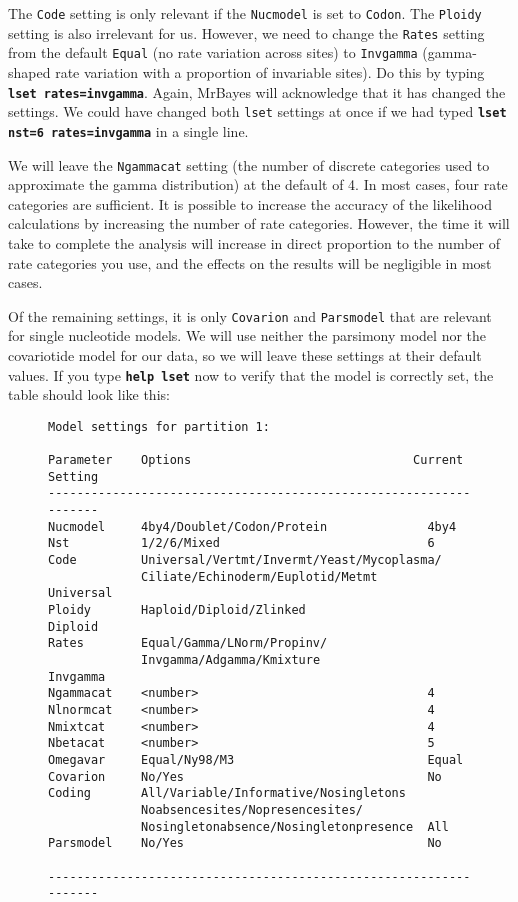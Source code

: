 \documentclass[12pt]{book}
\newcommand{\ttt}[1]{\texttt{#1}}
\newcommand{\tb}[1]{\ttt{\textbf{#1}}}
\begin{document}
The \texttt{Code} setting is only relevant if the \texttt{Nucmodel} is set to \texttt{Codon}. The
\texttt{Ploidy} setting is also irrelevant for us. However, we need to change the \texttt{Rates}
setting from the default \texttt{Equal} (no rate variation across sites) to \texttt{Invgamma}
(gamma-shaped rate variation with a proportion of invariable sites). Do this by typing \tb{lset
rates=invgamma}.  Again, MrBayes will acknowledge that it has changed the settings. We could have
changed both \texttt{lset} settings at once if we had typed \tb{lset nst=6 rates=invgamma} in a
single line.

We will leave the \texttt{Ngammacat} setting (the number of discrete categories used to approximate
the gamma distribution) at the default of 4. In most cases, four rate categories are sufficient. It
is possible to increase the accuracy of the likelihood calculations by increasing the number of
rate categories. However, the time it will take to complete the analysis will increase in direct
proportion to the number of rate categories you use, and the effects on the results will be
negligible in most cases.

Of the remaining settings, it is only \texttt{Covarion} and \texttt{Parsmodel} that are relevant
for single nucleotide models. We will use neither the parsimony model nor the covariotide model for
our data, so we will leave these settings at their default values. If you type \tb{help lset} now
to verify that the model is correctly set, the table should look like this:

\begin{figure}[H]
\centering
\begin{BVerbatim}
Model settings for partition 1:

Parameter    Options                               Current Setting
------------------------------------------------------------------
Nucmodel     4by4/Doublet/Codon/Protein              4by4
Nst          1/2/6/Mixed                             6
Code         Universal/Vertmt/Invermt/Yeast/Mycoplasma/
             Ciliate/Echinoderm/Euplotid/Metmt       Universal
Ploidy       Haploid/Diploid/Zlinked                 Diploid
Rates        Equal/Gamma/LNorm/Propinv/
             Invgamma/Adgamma/Kmixture               Invgamma
Ngammacat    <number>                                4
Nlnormcat    <number>                                4
Nmixtcat     <number>                                4
Nbetacat     <number>                                5
Omegavar     Equal/Ny98/M3                           Equal
Covarion     No/Yes                                  No
Coding       All/Variable/Informative/Nosingletons
             Noabsencesites/Nopresencesites/
             Nosingletonabsence/Nosingletonpresence  All
Parsmodel    No/Yes                                  No

------------------------------------------------------------------
\end{BVerbatim}
\end{figure}
\end{document}
